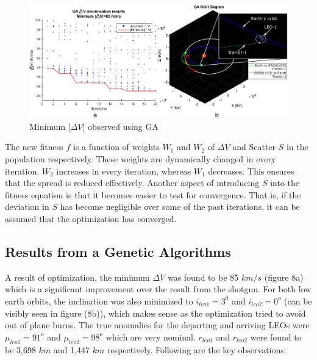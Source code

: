 \documentclass[11pt,a4paper]{article}
\begin{document}
\begin{figure}[H]
\centering
\includegraphics[]{images/Genetic.pdf}
\caption{Minimum |$\Delta V$| observed using GA}
\end{figure}

\begin{multicols}{2}

The new fitness $f$ is a function of weights $W_1$ and $W_2$ of $\Delta V$ and Scatter $S$ in the population respectively. These weights are dynamically changed in every iteration. $W_2$ increases in every iteration, whereas $W_1$ decreases. This ensures that the spread is reduced effectively. Another aspect of introducing $S$ into the fitness equation is that it becomes easier to test for convergence. That is, if the deviation in $S$ has become negligible over some of the past iterations, it can be assumed that the optimization has converged.

\subsection{Results from a Genetic Algorithms}

A result of optimization, the minimum $\Delta V$ was found to be 85 $km/s$ (figure 8a) which is a significant improvement over the result from the shotgun. For both low earth orbits, the inclination was also minimized to $i_{leo1}=3^0$ and $i_{leo2}=0^o$ (can be visibly seen in figure (8b)), which makes sense as the optimization tried to avoid out of plane burns. The true anomalies for the departing and arriving LEOs were $\mu_{leo1}=91^o$ and $\mu_{leo2}=98^o$ which are very nominal. $r_{leo1}$ and $r_{leo2}$ were found to be 3,698 $km$ and 1,447 $km$ respectively. Following are the key observations:


\end{multicols}
\end{document}

